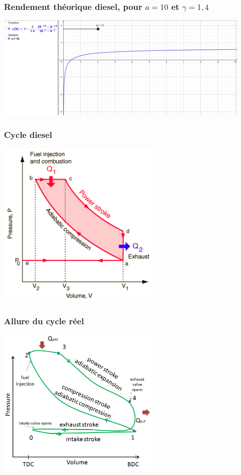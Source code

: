 \documentclass{beamer}
\begin{document}
\begin{frame}
\frametitle{Rendement théorique diesel, pour $a=10$ et $\gamma=1,4$}
\centerline{\includegraphics[width=12.5cm]{rendement_diesel}}
\end{frame}

\begin{frame}
\frametitle{Cycle diesel}
\centerline {\includegraphics[width=8cm]{cycle_diesel}}
\end{frame}

\begin{frame}
\frametitle{Allure du cycle réel}
\centerline{\includegraphics[width=8cm]{cycle_diesel_reel}}
\end{frame}
\end{document}
